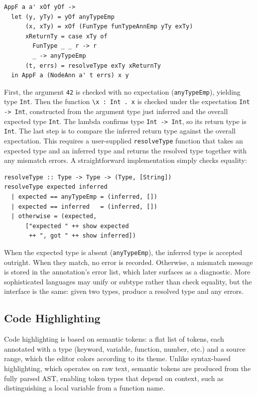 \begin{verbatim}
AppF a a' xOf yOf ->
  let (y, yTy) = yOf anyTypeEmp
      (x, xTy) = xOf (FunType funTypeAnnEmp yTy exTy)
      xReturnTy = case xTy of
        FunType _ _ r -> r
        _ -> anyTypeEmp
      (t, errs) = resolveType exTy xReturnTy
  in AppF a (NodeAnn a' t errs) x y
\end{verbatim}

First, the argument \texttt{42} is checked with no expectation (\texttt{anyTypeEmp}), yielding type \texttt{Int}.
Then the function \texttt{\textbackslash x : Int . x} is checked under the expectation \texttt{Int -> Int}, constructed from the argument type just inferred and the overall expected type \texttt{Int}.
The lambda confirms type \texttt{Int -> Int}, so its return type is \texttt{Int}.
The last step is to compare the inferred return type against the overall expectation.
This requires a user-supplied \texttt{resolveType} function that takes an expected type and an inferred type and returns the resolved type together with any mismatch errors.
A straightforward implementation simply checks equality:

\begin{verbatim}
resolveType :: Type -> Type -> (Type, [String])
resolveType expected inferred
  | expected == anyTypeEmp = (inferred, [])
  | expected == inferred   = (inferred, [])
  | otherwise = (expected,
      ["expected " ++ show expected
       ++ ", got " ++ show inferred])
\end{verbatim}

When the expected type is absent (\texttt{anyTypeEmp}), the inferred type is accepted outright.
When they match, no error is recorded.
Otherwise, a mismatch message is stored in the annotation's error list, which later surfaces as a diagnostic.
More sophisticated languages may unify or subtype rather than check equality, but the interface is the same: given two types, produce a resolved type and any errors.

\subsection{Code Highlighting}
\label{section:code_highlighting}

Code highlighting is based on semantic tokens: a flat list of tokens, each annotated with a type (keyword, variable, function, number, etc.) and a source range, which the editor colors according to its theme.
Unlike syntax-based highlighting, which operates on raw text, semantic tokens are produced from the fully parsed AST, enabling token types that depend on context, such as distinguishing a local variable from a function name.

